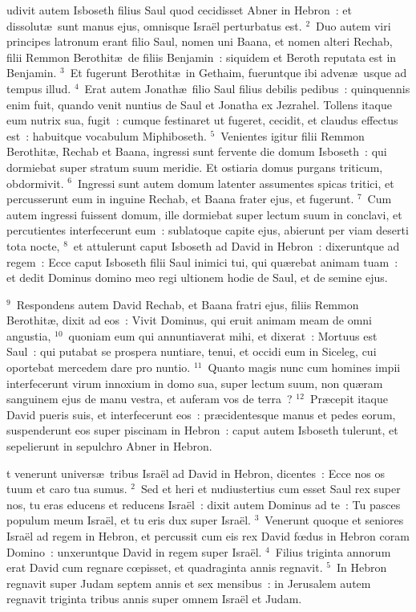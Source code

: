\bchapter
{}udivit autem Isboseth filius Saul quod cecidisset Abner in Hebron~: et dissolut\ae\ sunt manus ejus, omnisque Isra\"el perturbatus est.
${}^{2}$~Duo autem viri principes latronum erant filio Saul, nomen uni Baana, et nomen alteri Rechab, filii Remmon Berothit\ae\ de filiis Benjamin~: siquidem et Beroth reputata est in Benjamin.
${}^{3}$~Et fugerunt Berothit\ae\ in Gethaim, fueruntque ibi adven\ae\ usque ad tempus illud.
${}^{4}$~Erat autem Jonath\ae\ filio Saul filius debilis pedibus~: quinquennis enim fuit, quando venit nuntius de Saul et Jonatha ex Jezrahel. Tollens itaque eum nutrix sua, fugit~: cumque festinaret ut fugeret, cecidit, et claudus effectus est~: habuitque vocabulum Miphiboseth.
${}^{5}$~Venientes igitur filii Remmon Berothit\ae , Rechab et Baana, ingressi sunt fervente die domum Isboseth~: qui dormiebat super stratum suum meridie. Et ostiaria domus purgans triticum, obdormivit.
${}^{6}$~Ingressi sunt autem domum latenter assumentes spicas tritici, et percusserunt eum in inguine Rechab, et Baana frater ejus, et fugerunt.
${}^{7}$~Cum autem ingressi fuissent domum, ille dormiebat super lectum suum in conclavi, et percutientes interfecerunt eum~: sublatoque capite ejus, abierunt per viam deserti tota nocte,
${}^{8}$~et attulerunt caput Isboseth ad David in Hebron~: dixeruntque ad regem~: Ecce caput Isboseth filii Saul inimici tui, qui qu\ae rebat animam tuam~: et dedit Dominus domino meo regi ultionem hodie de Saul, et de semine ejus.


${}^{9}$~Respondens autem David Rechab, et Baana fratri ejus, filiis Remmon Berothit\ae , dixit ad eos~: Vivit Dominus, qui eruit animam meam de omni angustia,
${}^{10}$~quoniam eum qui annuntiaverat mihi, et dixerat~: Mortuus est Saul~: qui putabat se prospera nuntiare, tenui, et occidi eum in Siceleg, cui oportebat mercedem dare pro nuntio.
${}^{11}$~Quanto magis nunc cum homines impii interfecerunt virum innoxium in domo sua, super lectum suum, non qu\ae ram sanguinem ejus de manu vestra, et auferam vos de terra~?
${}^{12}$~Pr\ae cepit itaque David pueris suis, et interfecerunt eos~: pr\ae cidentesque manus et pedes eorum, suspenderunt eos super piscinam in Hebron~: caput autem Isboseth tulerunt, et sepelierunt in sepulchro Abner in Hebron.

\bchapter
{}t venerunt univers\ae\ tribus Isra\"el ad David in Hebron, dicentes~: Ecce nos os tuum et caro tua sumus.
${}^{2}$~Sed et heri et nudiustertius cum esset Saul rex super nos, tu eras educens et reducens Isra\"el~: dixit autem Dominus ad te~: Tu pasces populum meum Isra\"el, et tu eris dux super Isra\"el.
${}^{3}$~Venerunt quoque et seniores Isra\"el ad regem in Hebron, et percussit cum eis rex David fœdus in Hebron coram Domino~: unxeruntque David in regem super Isra\"el.
${}^{4}$~Filius triginta annorum erat David cum regnare cœpisset, et quadraginta annis regnavit.
${}^{5}$~In Hebron regnavit super Judam septem annis et sex mensibus~: in Jerusalem autem regnavit triginta tribus annis super omnem Isra\"el et Judam.


